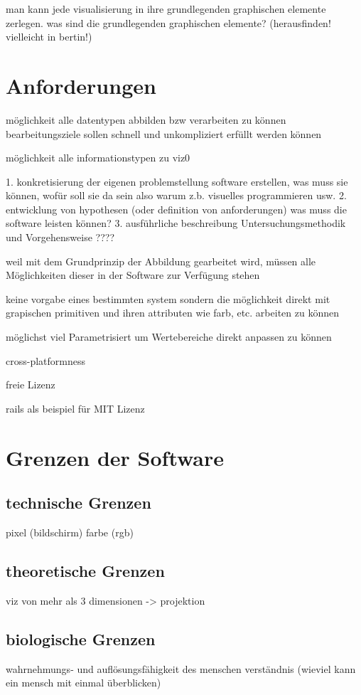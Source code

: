 \documentclass[a4paper, 12pt, onepage, pdftex, headsepline, footsepline]{scrreprt}
\begin{document}
man kann jede visualisierung in ihre grundlegenden graphischen elemente zerlegen.
was sind die grundlegenden graphischen elemente? (herausfinden! vielleicht in bertin!)
\section{Anforderungen}

möglichkeit alle datentypen abbilden bzw verarbeiten zu können
bearbeitungsziele sollen schnell und unkompliziert erfüllt werden können

möglichkeit alle informationstypen zu viz0

1. konkretisierung der eigenen problemstellung
software erstellen, was muss sie können, wofür soll sie da sein
also warum z.b. visuelles programmieren usw.
2. entwicklung von hypothesen (oder definition von anforderungen)
was muss die software leisten können?
3. ausführliche beschreibung Untersuchungsmethodik und Vorgehensweise
????

weil mit dem Grundprinzip der Abbildung gearbeitet wird, müssen alle Möglichkeiten dieser in der Software zur Verfügung stehen

keine vorgabe eines bestimmten system sondern die möglichkeit direkt mit grapischen primitiven und ihren attributen wie farb, etc. arbeiten zu können

möglichst viel Parametrisiert um Wertebereiche direkt anpassen zu können

cross-platformness

freie Lizenz

rails als beispiel für MIT Lizenz

\section{Grenzen der Software}
\subsection{technische Grenzen}
pixel (bildschirm)
farbe (rgb)
\subsection{theoretische Grenzen}
viz von mehr als 3 dimensionen -> projektion
\subsection{biologische Grenzen}
wahrnehmungs- und auflösungsfähigkeit des menschen
verständnis (wieviel kann ein mensch mit einmal überblicken)
\end{document}
